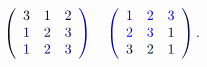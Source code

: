 \documentclass[12pt]{article}
\begin{document}
\makeatletter
\renewcommand*{\@textcolor}[3]{%
  \protect\leavevmode
  \begingroup
    \color#1{#2}#3%
  \endgroup
}
\makeatother
\begin{displaymath}
\mathcolor[RGB]{0,0,15}{\left(} \begin{array} {lll} { \mathcolor[RGB]{0,0,30}{3} } & { \mathcolor[RGB]{0,0,45}{1} } & { \mathcolor[RGB]{0,0,60}{2} } \\ { \mathcolor[RGB]{0,0,75}{1} } & { \mathcolor[RGB]{0,0,90}{2} } & { \mathcolor[RGB]{0,0,105}{3} } \\ { \mathcolor[RGB]{0,0,120}{1} } & { \mathcolor[RGB]{0,0,135}{2} } & { \mathcolor[RGB]{0,0,150}{3} } \end{array} \mathcolor[RGB]{0,0,165}{\right)} \quad \mathcolor[RGB]{0,0,180}{\left(} \begin{array} {lll} { \mathcolor[RGB]{0,0,195}{1} } & { \mathcolor[RGB]{0,0,210}{2} } & { \mathcolor[RGB]{0,0,225}{3} } \\ { \mathcolor[RGB]{0,0,240}{2} } & { \mathcolor[RGB]{0,0,255}{3} } & { \mathcolor[RGB]{0,15,0}{1} } \\ { \mathcolor[RGB]{0,15,15}{3} } & { \mathcolor[RGB]{0,15,30}{2} } & { \mathcolor[RGB]{0,15,45}{1} } \end{array} \mathcolor[RGB]{0,15,60}{\right)} \mathcolor[RGB]{0,15,75}{.}
\end{displaymath}
\end{document}
